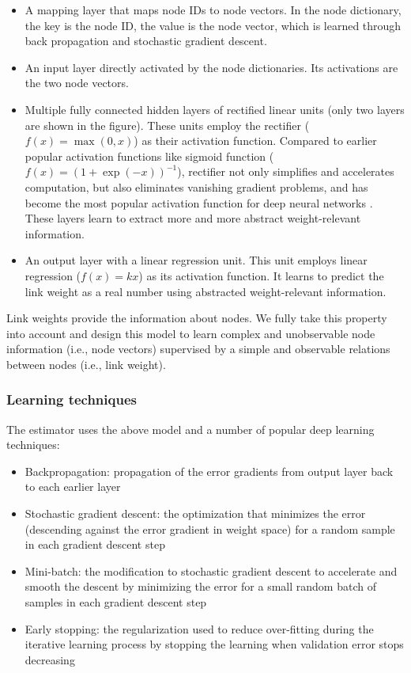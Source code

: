 \documentclass{article}
\begin{document}
\begin{itemize}
	\item A mapping layer that maps node IDs to node vectors.
	In the node dictionary,	the key is the node ID, the value is the node vector,
	which is learned through back propagation and stochastic gradient descent.
	\item An input layer directly activated by the node dictionaries.
	Its activations are the two node vectors.
	\item Multiple fully connected hidden layers of rectified linear units
	(only two layers are shown in the figure).
	These units employ the rectifier ($ f(x) = \max (0, x) $)
	as their activation function.
	Compared to earlier popular activation functions like sigmoid function
	($ f(x) = (1 + \exp(-x))^{-1} $),
	rectifier not only simplifies and accelerates computation,
	but also eliminates vanishing gradient problems,
	and has become the most popular activation function
	for deep neural networks \cite{lecun2015deep}.
	These layers learn to extract more and more abstract weight-relevant 
	information.
	\item An output layer with a linear regression unit.
	This unit employs linear regression ($ f(x) = kx $) as its activation function.
	It learns to predict the link weight as a real number
	using abstracted weight-relevant information.
\end{itemize}
Link weights provide the information about nodes.
We fully take this property into account and design this model to learn 
complex and unobservable node information (i.e., node vectors) 
supervised by a simple and observable relations between nodes (i.e., link weight).

\subsubsection{Learning techniques}
The estimator uses the above model and a number of popular deep learning 
techniques:
\begin{itemize}
	\item Backpropagation: propagation of the error gradients from output layer 
	back to each earlier layer \cite{rumelhart1988learning}
	\item Stochastic gradient descent: the optimization that minimizes 
	the error (descending against the error gradient in weight space) for a 
	random sample in each gradient descent step \cite{lecun2012efficient}
	\item Mini-batch: the modification to stochastic gradient descent to 
	accelerate and smooth the descent by minimizing the error for a small 
	random batch of samples in each gradient descent step \cite{mairal2010online}
	\item Early stopping: the regularization used to reduce over-fitting during the iterative learning process by stopping the learning when validation error stops decreasing \cite{smale2007learning}
\end{itemize}
\end{document}
